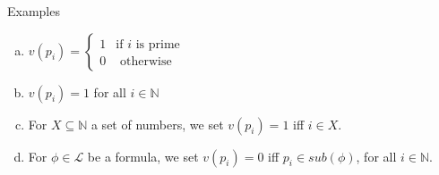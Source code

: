 \begin{frame}{Examples}
{\begin{enumerate}[(a)]
			\item $v(p_i)=\begin{cases} 1 & \text{if }i\text{ is prime}\\0 & \text{ otherwise}\end{cases}$
			
			\item $v(p_i)=1$ for all $i\in \mathbb{N}$
			
			\item For $X\subseteq \mathbb{N}$ a set of numbers, we set $v(p_i)=1$ iff $i\in X$.
			
			\item For $\phi\in\mathcal{L}$ be a formula, we set $v(p_i)=0$ iff $p_i\in sub(\phi)$, for all $i\in\mathbb{N}$.
			
			 	
		\end{enumerate}}

\end{frame}

